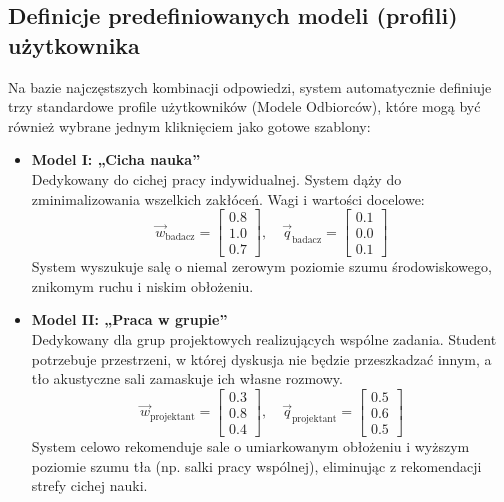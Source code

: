 \documentclass[14pt,a4paper]{extarticle}
\begin{document}
\subsection{Definicje predefiniowanych modeli (profili) użytkownika}
Na bazie najczęstszych kombinacji odpowiedzi, system automatycznie definiuje trzy standardowe profile użytkowników (Modele Odbiorców), które mogą być również wybrane jednym kliknięciem jako gotowe szablony:

\begin{itemize}
    \item \textbf{Model I: „Cicha nauka”} \\
    Dedykowany do cichej pracy indywidualnej. System dąży do zminimalizowania wszelkich zakłóceń. Wagi i wartości docelowe:
    \begin{equation}
    \vec{w}_{\text{badacz}} = \begin{bmatrix} 0.8 \\ 1.0 \\ 0.7 \end{bmatrix}, \quad \vec{q}_{\text{badacz}} = \begin{bmatrix} 0.1 \\ 0.0 \\ 0.1 \end{bmatrix}
    \end{equation}
    System wyszukuje salę o niemal zerowym poziomie szumu środowiskowego, znikomym ruchu i niskim obłożeniu.
    
    \item \textbf{Model II: „Praca w grupie”} \\
    Dedykowany dla grup projektowych realizujących wspólne zadania. Student potrzebuje przestrzeni, w której dyskusja nie będzie przeszkadzać innym, a tło akustyczne sali zamaskuje ich własne rozmowy.
    \begin{equation}
    \vec{w}_{\text{projektant}} = \begin{bmatrix} 0.3 \\ 0.8 \\ 0.4 \end{bmatrix}, \quad \vec{q}_{\text{projektant}} = \begin{bmatrix} 0.5 \\ 0.6 \\ 0.5 \end{bmatrix}
    \end{equation}
    System celowo rekomenduje sale o umiarkowanym obłożeniu i wyższym poziomie szumu tła (np. salki pracy wspólnej), eliminując z rekomendacji strefy cichej nauki.
    

\end{itemize}
\end{document}
